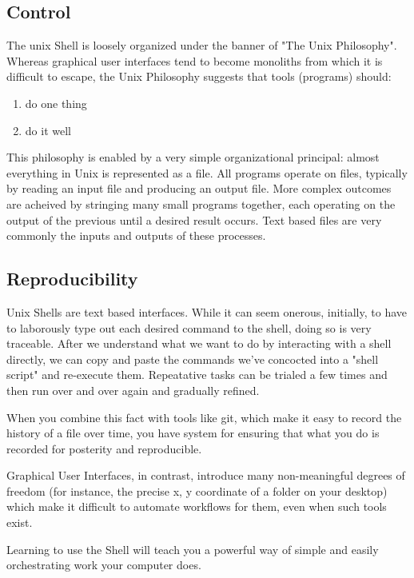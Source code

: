 \documentclass[11pt]{article}
\begin{document}
\subsection{Control}
\label{sec:org9c00a9b}

The unix Shell is loosely organized under the banner of "The Unix
Philosophy". Whereas graphical user interfaces tend to become
monoliths from which it is difficult to escape, the Unix Philosophy
suggests that tools (programs) should:

\begin{enumerate}
\item do one thing
\item do it well
\end{enumerate}

This philosophy is enabled by a very simple organizational principal:
almost everything in Unix is represented as a file. All programs
operate on files, typically by reading an input file and producing an
output file. More complex outcomes are acheived by stringing many
small programs together, each operating on the output of the previous
until a desired result occurs. Text based files are very commonly the
inputs and outputs of these processes.

\subsection{Reproducibility}
\label{sec:org503ee8a}

Unix Shells are text based interfaces. While it can seem onerous,
initially, to have to laborously type out each desired command to the
shell, doing so is very traceable. After we understand what we want to
do by interacting with a shell directly, we can copy and paste the
commands we've concocted into a "shell script" and re-execute
them. Repeatative tasks can be trialed a few times and then run over
and over again and gradually refined. 

When you combine this fact with tools like git, which make it easy to
record the history of a file over time, you have system for ensuring
that what you do is recorded for posterity and reproducible. 

Graphical User Interfaces, in contrast, introduce many non-meaningful
degrees of freedom (for instance, the precise x, y coordinate of a
folder on your desktop) which make it difficult to automate workflows
for them, even when such tools exist. 

Learning to use the Shell will teach you a powerful way of simple and
easily orchestrating work your computer does.
\end{document}
